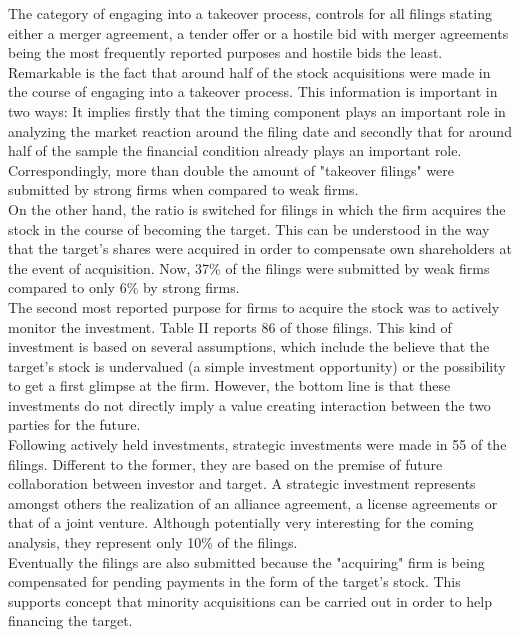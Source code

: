 \documentclass[12pt]{article}
\begin{document}
The category of engaging into a takeover process, controls for all filings stating either a merger agreement, a tender offer or a hostile bid with merger agreements being the most frequently reported purposes and hostile bids the least.
Remarkable is the fact that around half of the stock acquisitions were made in the course of engaging into a takeover process. This information is important in two ways: It implies firstly that the timing component plays an important role in analyzing the market reaction around the filing date and secondly that for around half of the sample the financial condition already plays an important role. Correspondingly, more than double the amount of "takeover filings" were submitted by strong firms when compared to weak firms.\\
On the other hand, the ratio is switched for filings in which the firm acquires the stock in the course of becoming the target. This can be understood in the way that the target's shares were acquired in order to compensate own shareholders at the event of acquisition. Now, 37\% of the filings were submitted by weak firms compared to only 6\% by strong firms.\\
The second most reported purpose for firms to acquire the stock was to actively monitor the investment. Table II reports 86 of those filings. This kind of investment is based on several assumptions, which include the believe that the target's stock is undervalued (a simple investment opportunity) or the possibility to get a first glimpse at the firm. However, the bottom line is that these investments do not directly imply a value creating interaction between the two parties for the future.\\
Following actively held investments, strategic investments were made in 55 of the filings. Different to the former, they are based on the premise of future collaboration between investor and target. A strategic investment represents amongst others the realization of an alliance agreement, a license agreements or that of a joint venture. Although potentially very interesting for the coming analysis, they represent only 10\% of the filings.\\
Eventually the filings are also submitted because the "acquiring" firm is being compensated for pending payments in the form of the target's stock. This supports \citet{Ouimet2013} concept that minority acquisitions can be carried out in order to help financing the target.
\end{document}
